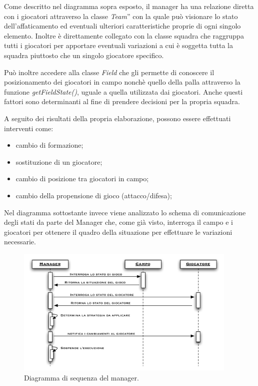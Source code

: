 \documentclass[aps,letterpaper,10pt]{article}
\begin{document}
Come descritto nel diagramma sopra esposto, il manager ha una relazione diretta con i giocatori attraverso la classe
\emph{Team}'' con la quale pu\`o visionare lo stato dell'affaticamento ed eventuali ulteriori caratteristiche proprie di
ogni singolo elemento. Inoltre \`e direttamente collegato con la classe squadra che raggruppa tutti i giocatori per
apportare eventuali variazioni a cui \`e soggetta tutta la squadra piuttosto che un singolo giocatore specifico.
\vspace{3mm}

Pu\`o inoltre accedere alla classe \emph{Field} che gli permette di conoscere il posizionamento dei giocatori in campo
nonch\`e quello della palla attraverso la funzione \emph{getFieldState()}, uguale a quella utilizzata dai giocatori.
Anche questi fattori sono determinanti al fine di prendere decisioni per la propria squadra. \vspace{3mm}

A seguito dei risultati della propria elaborazione, possono essere effettuati interventi come:

\begin{itemize}
	\item cambio di formazione;
	\item sostituzione di un giocatore;
	\item cambio di posizione tra giocatori in campo;
	\item cambio della propensione di gioco (attacco/difesa);
\end{itemize}

Nel diagramma sottostante invece viene analizzato lo schema di comunicazione degli stati da parte del Manager che, come
gi\`a visto, interroga il campo e i giocatori per ottenere il quadro della situazione per effettuare le variazioni
necessarie. \vspace{3mm}

\begin{figure}[H]
	\begin{center}
		\includegraphics[width=400px]{images/manager-sequence.pdf}
	\end{center}
\caption{Diagramma di sequenza del manager.}
\end{figure}
\end{document}
